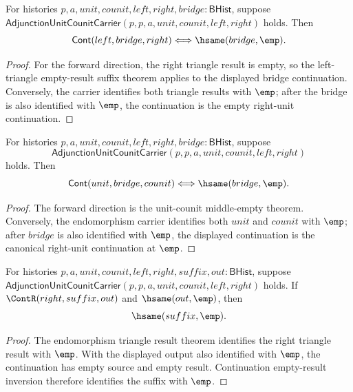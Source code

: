 \begin{theorem}
\label{thm:monad-adjunction-endomorphism-triangle-bridge-empty-iff}
For histories $p,a,unit,counit,left,right,bridge:\mathsf{BHist}$, suppose
$\mathsf{AdjunctionUnitCounitCarrier}(p,p,a,unit,counit,left,right)$ holds.
Then
$$
\mathsf{Cont}(left,bridge,right)\Longleftrightarrow\hsame(bridge,\emp).
$$
\end{theorem}
\begin{proof}
For the forward direction, the right triangle result is empty, so the
left-triangle empty-result suffix theorem applies to the displayed bridge
continuation. Conversely, the carrier identifies both triangle results with
$\emp$; after the bridge is also identified with $\emp$, the continuation is
the empty right-unit continuation.
\end{proof}

\begin{theorem}
\label{thm:monad-adjunction-endomorphism-unit-counit-bridge-empty-iff}
For histories $p,a,unit,counit,left,right,bridge:\mathsf{BHist}$, suppose
$$
\mathsf{AdjunctionUnitCounitCarrier}(p,p,a,unit,counit,left,right)
$$
holds. Then
$$
\mathsf{Cont}(unit,bridge,counit)\Longleftrightarrow\hsame(bridge,\emp).
$$
\end{theorem}
\begin{proof}
The forward direction is the unit-counit middle-empty theorem. Conversely, the
endomorphism carrier identifies both $unit$ and $counit$ with $\emp$; after
$bridge$ is also identified with $\emp$, the displayed continuation is the
canonical right-unit continuation at $\emp$.
\end{proof}

\begin{theorem}
\label{thm:monad-adjunction-right-triangle-empty-result-suffix-empty}
For histories $p,a,unit,counit,left,right,suffix,out:\mathsf{BHist}$, suppose
$\mathsf{AdjunctionUnitCounitCarrier}(p,p,a,unit,counit,left,right)$ holds. If
$\ContR(right,suffix,out)$ and $\hsame(out,\emp)$, then
$$
\hsame(suffix,\emp).
$$
\end{theorem}
\begin{proof}
The endomorphism triangle result theorem identifies the right triangle result
with $\emp$. With the displayed output also identified with $\emp$, the
continuation has empty source and empty result. Continuation empty-result
inversion therefore identifies the suffix with $\emp$.
\end{proof}

